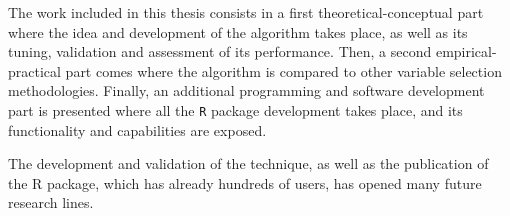 The work included in this thesis consists in a first theoretical-conceptual part where the idea and development of the algorithm takes place, as well as its tuning, validation and assessment of its performance. Then, a second empirical-practical part comes where the algorithm is compared to other variable selection methodologies. Finally, an additional programming and software development part is presented where all the \texttt{R} package development takes place, and its functionality and capabilities are exposed.

The development and validation of the technique, as well as the publication of the R package, which has already hundreds of users, has opened many future research lines.

\ifEBOOKPDF
	\bigskip
\else
	\vfill
\fi

